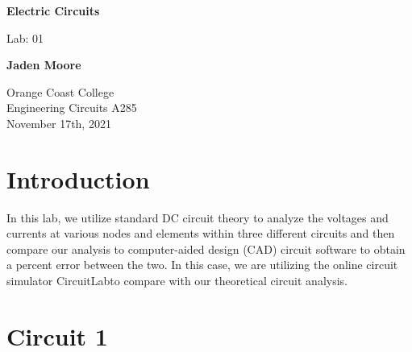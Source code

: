 \documentclass[12pt]{article}
\begin{document}

\begin{titlepage}
    \begin{center}
        \vspace*{1cm}
        \textbf{Electric Circuits}

        \vspace{0.5cm}
        Lab: 01

        \vspace{1cm}

        \textbf{Jaden Moore}

        \vfill

        Orange Coast College\\
        Engineering Circuits A285\\
        November 17th, 2021

    \end{center}
\end{titlepage}

\pagestyle{fancy}
\fancyhf{}
\setlength{\headheight}{15pt}
\cfoot{\thepage}

\section{Introduction}
In this lab, we utilize standard DC circuit theory to analyze the voltages and currents at various nodes and elements  within three different circuits and then compare our analysis to computer-aided design (CAD) circuit software to obtain a percent error between the two. In this case, we are utilizing the online circuit simulator CircuitLab\textregistered\space to compare with our theoretical circuit analysis.

\section{Circuit 1}
\end{document}
